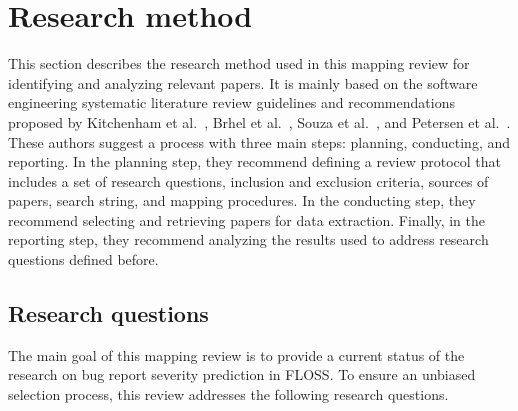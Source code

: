 \section{Research method}\label{sec:research_method}
This section describes the research method used in this mapping review for identifying and analyzing relevant papers. It is mainly based on the software engineering systematic literature review guidelines and recommendations proposed by Kitchenham et al.~\cite{Kitchenham:2007}, Brhel et al.~\cite{Brhel:2015}, Souza et al.~\cite{Desouza:2015}, and Petersen et al.~\cite{Petersen:2008}. These authors suggest a process with three main steps: planning, conducting, and reporting. In the planning step, they recommend defining a review protocol that includes a set of research questions, inclusion and exclusion criteria, sources of papers, search string, and mapping procedures. In the conducting step, they recommend selecting and retrieving papers for data extraction. Finally, in the reporting step, they recommend analyzing the results used to address research questions defined before.

\subsection{Research questions}\label{subsec:questions}
The main goal of this mapping review is to provide a current status of the research on bug report severity prediction in FLOSS. To ensure an unbiased selection process, this review addresses the following research questions.

